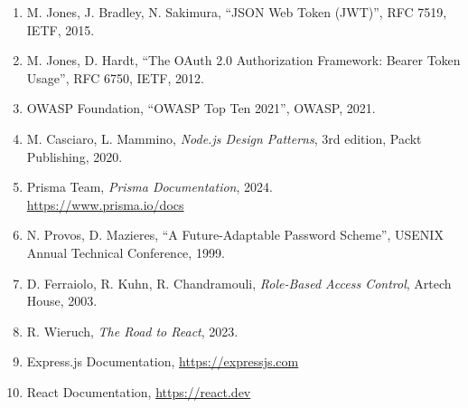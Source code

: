 \documentclass[12pt,a4paper]{report}
\begin{document}
\begin{enumerate}
  \item M. Jones, J. Bradley, N. Sakimura, ``JSON Web Token (JWT)'',
        RFC 7519, IETF, 2015.

  \item M. Jones, D. Hardt, ``The OAuth 2.0 Authorization Framework:
        Bearer Token Usage'', RFC 6750, IETF, 2012.

  \item OWASP Foundation, ``OWASP Top Ten 2021'', OWASP, 2021.

  \item M. Casciaro, L. Mammino, \textit{Node.js Design Patterns},
        3rd edition, Packt Publishing, 2020.

  \item Prisma Team, \textit{Prisma Documentation}, 2024.\\
        \url{https://www.prisma.io/docs}

  \item N. Provos, D. Mazieres, ``A Future-Adaptable Password Scheme'',
        USENIX Annual Technical Conference, 1999.

  \item D. Ferraiolo, R. Kuhn, R. Chandramouli, \textit{Role-Based
        Access Control}, Artech House, 2003.

  \item R. Wieruch, \textit{The Road to React}, 2023.

  \item Express.js Documentation, \url{https://expressjs.com}

  \item React Documentation, \url{https://react.dev}
\end{enumerate}

\end{document}
